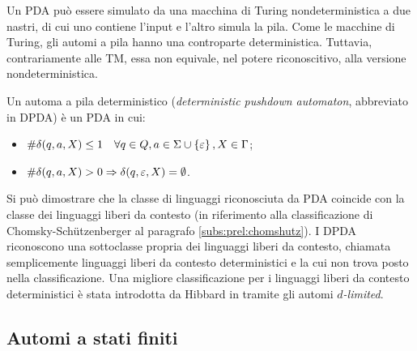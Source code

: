 Un PDA può essere simulato da una macchina di Turing nondeterministica a due nastri, di cui uno contiene l'input e l'altro simula la pila.
Come le macchine di Turing, gli automi a pila hanno una controparte deterministica. Tuttavia, contrariamente alle TM, essa non equivale, nel potere riconoscitivo, alla versione nondeterministica.
\begin{defin}
	Un automa a pila deterministico (\emph{deterministic pushdown automaton}, abbreviato in DPDA) è un PDA in cui:
	\begin{itemize}
		\item $\# \delta(q,a,X)\leq 1\quad \forall q\in Q, a\in\Sigma\cup\left\{ \varepsilon \right\}, X\in\Gamma$;
		\item $\# \delta(q,a,X)>0\Rightarrow \delta(q,\varepsilon,X)=\emptyset$.
	\end{itemize}
\end{defin}

Si può dimostrare che la classe di linguaggi riconosciuta da PDA coincide con la classe dei linguaggi liberi da contesto (in riferimento alla classificazione di Chomsky-Schützenberger al paragrafo \ref{subs:prel:chomshutz}). I DPDA riconoscono una sottoclasse propria dei linguaggi liberi da contesto, chiamata semplicemente linguaggi liberi da contesto deterministici e la cui non trova posto nella classificazione. Una migliore classificazione per i linguaggi liberi da contesto deterministici è stata introdotta da Hibbard in \cite{Hibbard:67:CFdet} tramite gli automi \emph{$d$-limited}.


\subsection{Automi a stati finiti}

